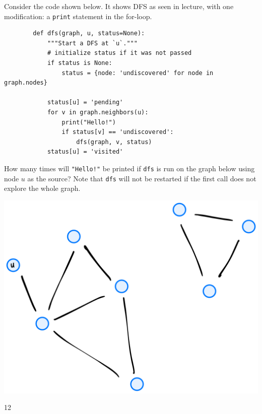 \begin{prob}

    Consider the code shown below. It shows DFS as seen in lecture, with one
    modification: a \texttt{print} statement in the for-loop.


    \begin{verbatim}
        def dfs(graph, u, status=None):
            """Start a DFS at `u`."""
            # initialize status if it was not passed
            if status is None:
                status = {node: 'undiscovered' for node in graph.nodes}

            status[u] = 'pending'
            for v in graph.neighbors(u):
                print("Hello!")
                if status[v] == 'undiscovered':
                    dfs(graph, v, status)
            status[u] = 'visited'
    \end{verbatim}

How many times will \texttt{"Hello!"} be printed if \texttt{dfs} is
run on the graph below using node $u$ as the source? Note that \texttt{dfs} will not be
restarted if the first call does not explore the whole graph.

\includegraphics[width=.4\textwidth]{./g4.png}

\begin{soln}
    12
\end{soln}

\end{prob}
